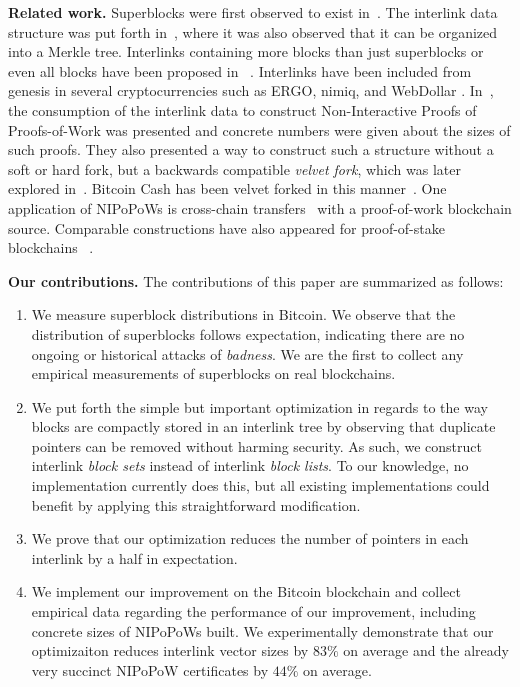 \noindent
\textbf{Related work.}
Superblocks were first observed to exist in~\cite{highway}.
The interlink data structure was put forth in~\cite{popow}, where it was also
observed that it can be organized into a Merkle tree. Interlinks containing more
blocks than just superblocks or even all blocks have been
proposed in~\cite{vitalik-eip,flyclient} . Interlinks have
been included from genesis in several cryptocurrencies such as ERGO, nimiq, and
WebDollar . In~\cite{nipopows}, the consumption of the
interlink data to construct Non-Interactive Proofs of Proofs-of-Work was
presented and concrete numbers were given about the sizes of such proofs. They
also presented a way to construct such a structure without a soft or hard fork,
but a backwards compatible \emph{velvet fork}, which was later explored
in~\cite{velvet}. Bitcoin Cash has been velvet forked in this
manner~\cite{gtklocker}. One application of NIPoPoWs is cross-chain
transfers~\cite{pow-sidechains}  with a proof-of-work
blockchain source. Comparable constructions have also appeared for
proof-of-stake blockchains~\cite{pos-sidechains} .

\noindent
\textbf{Our contributions.} The contributions of this paper are summarized as
follows:

\begin{enumerate}
  \item We measure superblock distributions in Bitcoin. We observe that the
        distribution of superblocks follows expectation, indicating there are no
        ongoing or historical attacks of \emph{badness}. We are the first to
        collect any empirical measurements of superblocks on real blockchains.
  \item We put forth the simple but important optimization in regards to the way
        blocks are compactly stored in an interlink tree by observing that
        duplicate pointers can be removed without harming security. As such, we
        construct interlink \emph{block sets} instead of interlink \emph{block
        lists}. To our knowledge, no implementation currently does this, but all
        existing implementations could benefit by applying this straightforward
        modification.
  \item We prove that our optimization reduces the number of pointers in each
        interlink by a half in expectation.
  \item We implement our improvement on the Bitcoin blockchain and collect
        empirical data regarding the performance of our improvement, including
        concrete sizes of NIPoPoWs built. We experimentally demonstrate that our
        optimizaiton reduces interlink vector sizes by $83\%$ on average and
        the already very succinct NIPoPoW certificates by $44\%$ on average.
\end{enumerate}
